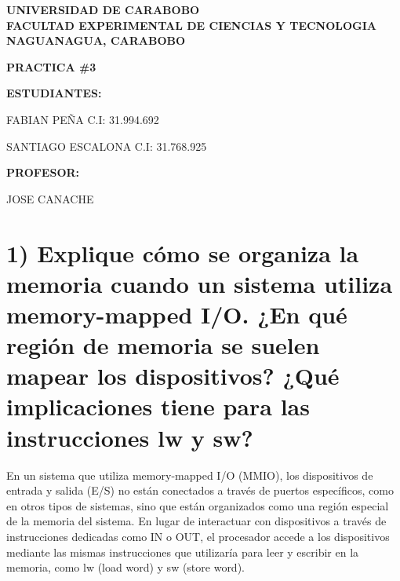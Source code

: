 \documentclass[12pt]{article}
\begin{document}
\begin{center}
\textbf{UNIVERSIDAD DE CARABOBO}\\
\vspace{0.3cm}
\textbf{FACULTAD EXPERIMENTAL DE CIENCIAS Y TECNOLOGIA}\\
\vspace{0.3cm}
\textbf{NAGUANAGUA, CARABOBO}
\end{center}

\vspace{1.5cm}


\vspace{2cm}

\begin{center}
\textbf{PRACTICA \#3}
\end{center}

\vspace{2cm}

\noindent
\textbf{ESTUDIANTES:}

\vspace{0.5cm}

\noindent
FABIAN PEÑA C.I: 31.994.692

\noindent
SANTIAGO ESCALONA C.I: 31.768.925

\vspace{1.5cm}

\noindent
\textbf{PROFESOR:}

\vspace{0.5cm}

\noindent
JOSE CANACHE

\vspace{2cm}
\vspace{2cm}
\vspace{2cm}


\section*{1) Explique cómo se organiza la memoria cuando un sistema utiliza memory-mapped I/O. ¿En qué región de memoria se suelen mapear los dispositivos? ¿Qué implicaciones tiene para las instrucciones lw y sw?}

En un sistema que utiliza memory-mapped I/O (MMIO), los dispositivos de entrada y salida (E/S) no están conectados a través de puertos específicos, como en otros tipos de sistemas, sino que están organizados como una región especial de la memoria del sistema. En lugar de interactuar con dispositivos a través de instrucciones dedicadas como IN o OUT, el procesador accede a los dispositivos mediante las mismas instrucciones que utilizaría para leer y escribir en la memoria, como lw (load word) y sw (store word).
\end{document}

